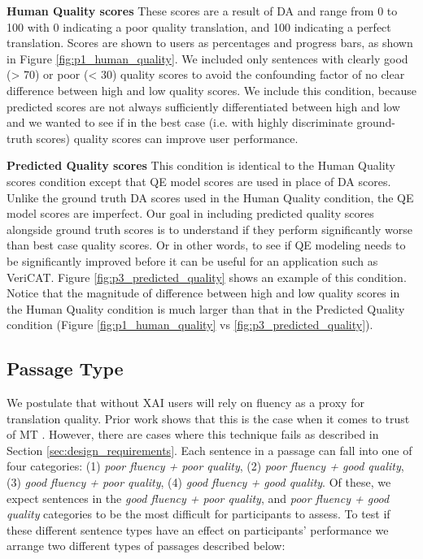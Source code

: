 \begin{compacthang}
    \item \textbf{Human Quality scores} These scores are a result of DA and range from 0 to 100 with 0 indicating a poor quality translation, and 100 indicating a perfect translation. Scores are shown to users as percentages and progress bars, as shown in Figure \ref{fig:p1_human_quality}. We included only sentences with clearly good (> 70) or poor (< 30) quality scores to avoid the confounding factor of no clear difference between high and low quality scores. We include this condition, because predicted scores are not always sufficiently differentiated between high and low and we wanted to see if in the best case (i.e. with highly discriminate ground-truth scores) quality scores can improve user performance.  

    \item \textbf{Predicted Quality scores} This condition is identical to the Human Quality scores condition except that QE model scores are used in place of DA scores. Unlike the ground truth DA scores used in the Human Quality condition, the QE model scores are imperfect. Our goal in including predicted quality scores alongside ground truth scores is to understand if they perform significantly worse than best case quality scores. Or in other words, to see if QE modeling needs to be significantly improved before it can be useful for an application such as VeriCAT. Figure \ref{fig:p3_predicted_quality} shows an example of this condition. Notice that the magnitude of difference between high and low quality scores in the Human Quality condition is much larger than that in the  Predicted Quality condition (Figure \ref{fig:p1_human_quality} vs \ref{fig:p3_predicted_quality}).   
    
\end{compacthang}

\subsection{Passage Type}
We postulate that without XAI users will rely on fluency as a proxy for translation quality. Prior work shows that this is the case when it comes to trust of MT \cite{martindaleFluency2018}. However, there are cases where this technique fails as described in Section \ref{sec:design_requirements}.  
Each sentence in a passage can fall into one of four categories: (1) \textit{poor fluency + poor quality}, (2) \textit{poor fluency + good quality}, (3) \textit{good fluency + poor quality}, (4) \textit{good fluency + good quality}. Of these, we expect  sentences in the \textit{good fluency + poor quality}, and \textit{poor fluency + good quality} categories to be the most difficult for participants to assess. To test if these different sentence types have an effect on participants’ performance we arrange two different types of passages described below: 


